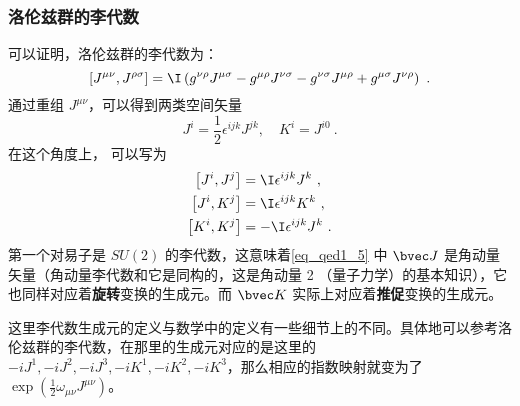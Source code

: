 \subsubsection{洛伦兹群的李代数}
可以证明，洛伦兹群的李代数为：
\begin{equation}\left[J^{\mu \nu}, J^{\rho \sigma}\right]=\I\left(g^{\nu \rho} J^{\mu \sigma}-g^{\mu \rho} J^{\nu \sigma}-g^{\nu \sigma} J^{\mu \rho}+g^{\mu \sigma} J^{\nu \rho}\right)~.\end{equation}
通过重组 $J^{\mu\nu}$，可以得到两类空间矢量
\begin{equation}\label{eq_qed1_5}J^{i}=\frac{1}{2} \epsilon^{i j k} J^{j k}, \quad K^{i}=J^{i 0}~.\end{equation}
在这个角度上， 可以写为
\begin{equation}\begin{aligned}
\left[J^{i}, J^{j}\right] &=\I \epsilon^{i j k} J^{k}~, \\
\left[J^{i}, K^{j}\right] &=\I \epsilon^{i j k} K^{k}~, \\
\left[K^{i}, K^{j}\right] &=-\I \epsilon^{i j k} J^{k}~.
\end{aligned}\end{equation}
第一个对易子是 $SU(2)$ 的李代数，这意味着\autoref{eq_qed1_5} 中 $\bvec J$ 是角动量矢量（角动量李代数和它是同构的，这是角动量 2 （量子力学）的基本知识），它也同样对应着\textbf{旋转}变换的生成元。而 $\bvec K$ 实际上对应着\textbf{推促}变换的生成元。

这里李代数生成元的定义与数学中的定义有一些细节上的不同。具体地可以参考洛伦兹群的李代数，在那里的生成元对应的是这里的 $-iJ^1,-iJ^2,-iJ^3,-iK^1,-iK^2,-iK^3$，那么相应的指数映射就变为了 $\exp(\frac{1}{2}\omega_{\mu\nu}J^{\mu\nu})$。
